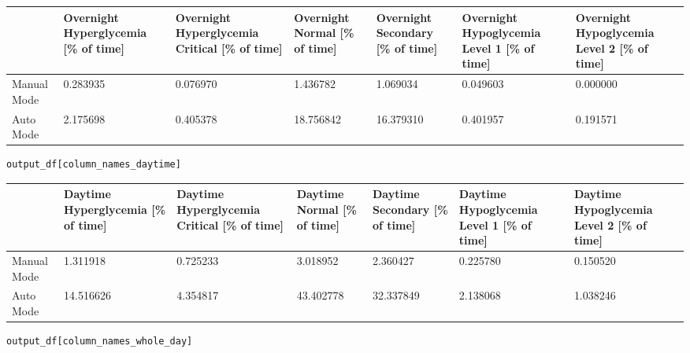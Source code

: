 \bigskip\noindent
\begin{tabular}{p{}p{}p{}p{}p{}p{}p{}}
\toprule
 & Overnight Hyperglycemia [\% of time] & Overnight Hyperglycemia Critical [\% of time] & Overnight Normal [\% of time] & Overnight Secondary [\% of time] & Overnight Hypoglycemia Level 1 [\% of time] & Overnight Hypoglycemia Level 2 [\% of time] \\
\hline
Manual Mode & 0.283935 & 0.076970 & 1.436782 & 1.069034 & 0.049603 & 0.000000 \\
\hline
Auto Mode & 2.175698 & 0.405378 & 18.756842 & 16.379310 & 0.401957 & 0.191571 \\
\hline
\bottomrule
\end{tabular}

\bigskip

\begin{verbatim}
output_df[column_names_daytime]
\end{verbatim}

\bigskip\noindent
\begin{tabular}{p{}p{}p{}p{}p{}p{}p{}}
\toprule
 & Daytime Hyperglycemia [\% of time] & Daytime Hyperglycemia Critical [\% of time] & Daytime Normal [\% of time] & Daytime Secondary [\% of time] & Daytime Hypoglycemia Level 1 [\% of time] & Daytime Hypoglycemia Level 2 [\% of time] \\
\hline
Manual Mode & 1.311918 & 0.725233 & 3.018952 & 2.360427 & 0.225780 & 0.150520 \\
\hline
Auto Mode & 14.516626 & 4.354817 & 43.402778 & 32.337849 & 2.138068 & 1.038246 \\
\hline
\bottomrule
\end{tabular}

\bigskip

\begin{verbatim}
output_df[column_names_whole_day]
\end{verbatim}

